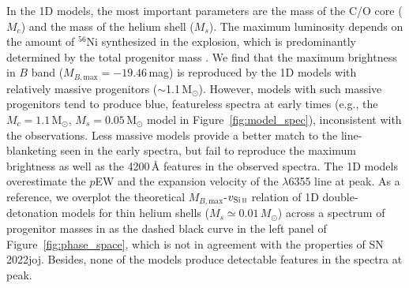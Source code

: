 \documentclass[twocolumn]{aastex631}
\newcommand{\sn}{SN\,2022joj}
\begin{document}
\begin{CJK*}{UTF8}{gbsn}
In the 1D models, the most important parameters are the mass of the C/O core ($M_c$) and the mass of the helium shell ($M_s$). The maximum luminosity depends on the amount of $^{56}$Ni synthesized in the explosion, which is predominantly determined by the total progenitor mass \citep[$M_c+M_s$;][]{polin_observational_2019}. We find that the maximum brightness in $B$ band ($M_{B,\mathrm{max}}=-19.46$\,mag) is reproduced by the 1D models with relatively massive progenitors ($\sim$1.1\,$\mathrm{M_\odot}$). However, models with such massive progenitors tend to produce blue, featureless spectra at early times (e.g., the $M_c=1.1\,\mathrm{M_\odot}$, $M_s=0.05\,\mathrm{M_\odot}$ model in Figure~\ref{fig:model_spec}), inconsistent with the observations. Less massive models provide a better match to the line-blanketing seen in the early spectra, but fail to reproduce the maximum brightness as well as the 4200\,\r{A} features in the observed spectra. The 1D models overestimate the $p$EW and the expansion velocity of the  $\lambda$6355 line at peak. As a reference, we overplot the theoretical $M_{B,\mathrm{max}}$-$v_\mathrm{Si\,\textsc{ii}}$ relation of 1D double-detonation models for thin helium shells ($M_s \simeq 0.01\,M_\odot$) across a spectrum of progenitor masses in \citet{polin_observational_2019} as the dashed black curve in the left panel of Figure~\ref{fig:phase_space}, which is not in agreement with the properties of \sn. Besides, none of the models produce detectable  features in the spectra at peak.


\end{CJK*}
\end{document}

